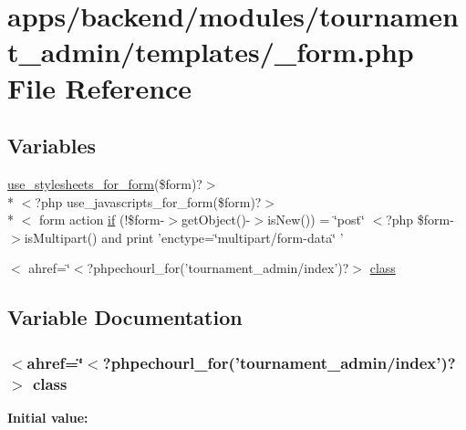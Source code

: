 \hypertarget{backend_2modules_2tournament__admin_2templates_2__form_8php}{\section{apps/backend/modules/tournament\-\_\-admin/templates/\-\_\-form.php File Reference}
\label{backend_2modules_2tournament__admin_2templates_2__form_8php}
}
\subsection*{Variables}
\begin{DoxyCompactItemize}
\item 
\hyperlink{live_2modules_2user_2templates_2__form_8php_a86bc4522fdbe625b07bc4a4d6eec3df7}{use\-\_\-stylesheets\-\_\-for\-\_\-form}(\$form)?$>$\\*
$<$?php use\-\_\-javascripts\-\_\-for\-\_\-form(\$form)?$>$\\*
$<$ form action \hyperlink{backend_2modules_2tournament__admin_2templates_2__form_8php_ae30a307b320d8da5d9a945eaf68f7549}{if} (!\$form-\/$>$get\-Object()-\/$>$is\-New()) = \char`\"{}post\char`\"{} $<$?php \$form-\/$>$is\-Multipart() and print 'enctype=\char`\"{}multipart/form-\/data\char`\"{} '
\item 
$<$ ahref=\char`\"{}$<$?phpechourl\-\_\-for('tournament\-\_\-admin/index')?$>$ \hyperlink{backend_2modules_2tournament__admin_2templates_2__form_8php_a55dff74b1d717adcb7492cadd2b5dabe}{class}
\end{DoxyCompactItemize}


\subsection{Variable Documentation}
\hypertarget{backend_2modules_2tournament__admin_2templates_2__form_8php_a55dff74b1d717adcb7492cadd2b5dabe}{
\subsubsection[{class}]{\setlength{\rightskip}{0pt plus 5cm}$<$ahref=\char`\"{}$<$?phpechourl\-\_\-for('tournament\-\_\-admin/index')?$>$ class}}\label{backend_2modules_2tournament__admin_2templates_2__form_8php_a55dff74b1d717adcb7492cadd2b5dabe}
{\bfseries Initial value\-:}


